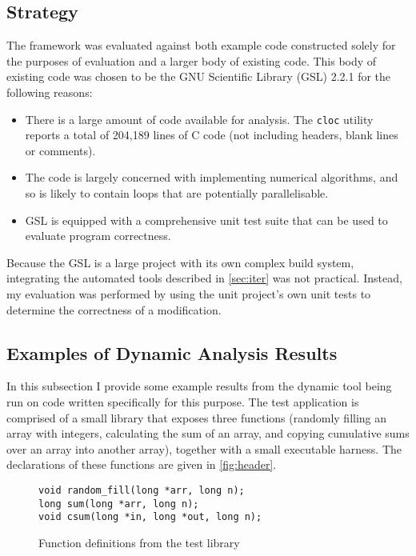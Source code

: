 \documentclass[journal]{IEEEtran}
\begin{document}
\subsection{Strategy}

The framework was evaluated against both example code constructed solely for the
purposes of evaluation and a larger body of existing code. This body of existing
code was chosen to be the GNU Scientific Library (GSL) 2.2.1
\cite{gough_gnu_2009} for the following reasons:

\begin{itemize}
  \item There is a large amount of code available for analysis. The
    \texttt{cloc} utility \cite{_aldanial/cloc_????} reports a total of 204,189
    lines of C code (not including headers, blank lines or comments).
  \item The code is largely concerned with implementing numerical algorithms,
    and so is likely to contain loops that are potentially parallelisable.
  \item GSL is equipped with a comprehensive unit test suite that can be used to
    evaluate program correctness.
\end{itemize}

Because the GSL is a large project with its own complex build system,
integrating the automated tools described in \autoref{sec:iter} was not
practical. Instead, my evaluation was performed by using the unit project's own
unit tests to determine the correctness of a modification.

\subsection{Examples of Dynamic Analysis Results}

In this subsection I provide some example results from the dynamic tool being
run on code written specifically for this purpose. The test application is
comprised of a small library that exposes three functions (randomly filling an
array with integers, calculating the sum of an array, and copying cumulative
sums over an array into another array), together with a small executable
harness. The declarations of these functions are given in
\autoref{fig:header}.

\begin{figure}[h]
  \centering
  \begin{lstlisting}
void random_fill(long *arr, long n);
long sum(long *arr, long n);
void csum(long *in, long *out, long n);
  \end{lstlisting}
  \caption{Function definitions from the test library}
  \label{fig:header}
\end{figure}
\end{document}
